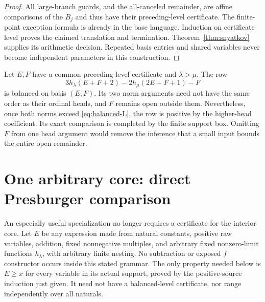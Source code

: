 \documentclass[11pt]{article}
\begin{document}
\begin{proof}
All large-branch guards, and the all-canceled remainder, are affine
comparisons of the $B_j$ and thus have their preceding-level certificate.
The finite-point exception formula is already in the base language.
Induction on certificate level proves the claimed translation and
termination. Theorem~\ref{thm:snyatkov} supplies its arithmetic decision.
Repeated basis entries and shared variables never become independent
parameters in this construction.
\end{proof}

\begin{example}
Let $E,F$ have a common preceding-level certificate and $\lambda>\mu$.
The row
\[
 3h_\lambda(E+F+2)-2h_\mu(2E+F+1)-F
\]
is balanced on basis $(E,F)$. Its two norm arguments need not have the
same order as their ordinal heads, and $F$ remains open outside them.
Nevertheless, once both norms exceed \eqref{eq:balanced-L}, the row is
positive by the higher-head coefficient. Its exact comparison is completed
by the finite support box. Omitting $F$ from one head argument would
remove the inference that a small input bounds the entire open remainder.
\end{example}

\section{One arbitrary core: direct Presburger comparison}
An especially useful specialization no longer requires a certificate for the
interior core. Let $E$ be any expression made from natural constants,
positive raw variables, addition, fixed nonnegative multiples, and arbitrary
fixed nonzero-limit functions $h_\lambda$, with arbitrary finite nesting.
No subtraction or exposed $f$ constructor occurs inside this stated grammar.
The only property needed below is $E\ge x$ for every variable in its actual
support, proved by the positive-source induction just given. It need not
have a balanced-level certificate, nor range independently over all naturals.
\end{document}
